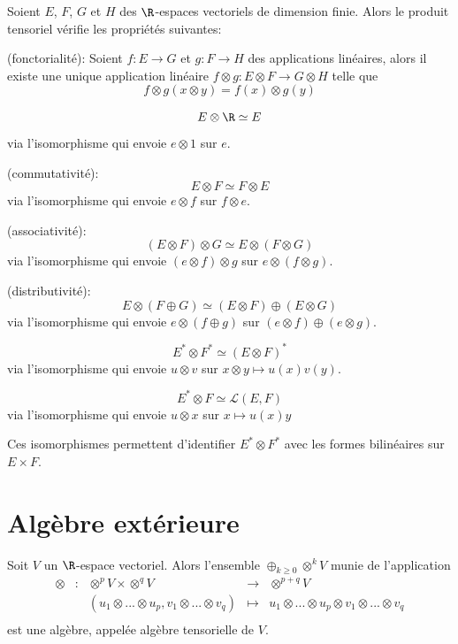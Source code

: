 \begin{pro}
Soient $E$, $F$, $G$ et $H$ des $\R$-espaces vectoriels de dimension finie. Alors le produit tensoriel vérifie les propriétés suivantes:
\be
	\item (fonctorialité): Soient $f: E\to G$ et $g: F\to H$ des applications linéaires, alors il existe une unique application linéaire $f\otimes g: E\otimes F \to G \otimes H$ telle que 
	$$f\otimes g(x\otimes y) = f(x) \otimes g(y)$$
	\item $$E \otimes \R \simeq E$$
	via l'isomorphisme qui envoie $e\otimes 1$ sur $e$.
	\item (commutativité): $$E\otimes F \simeq F \otimes E$$
	via l'isomorphisme qui envoie $e\otimes f$ sur $f\otimes e$.
	\item (associativité): $$(E\otimes F)\otimes G \simeq E \otimes (F\otimes G)$$
	via l'isomorphisme qui envoie $(e\otimes f)\otimes g$ sur $e\otimes (f\otimes g)$.
	\item (distributivité): $$E \otimes (F \oplus G) \simeq (E \otimes F) \oplus (E \otimes G)$$
	via l'isomorphisme qui envoie $e\otimes (f\oplus g)$ sur $(e\otimes f) \oplus (e \otimes g)$.
	\item $$E^* \otimes F^* \simeq (E\otimes F)^*$$
	via l'isomorphisme qui envoie $u\otimes v$ sur $x\otimes y \mapsto u(x)v(y)$.
	\item $$E^*\otimes F \simeq \mathscr{L}(E, F)$$
	via l'isomorphisme qui envoie $u\otimes x$ sur $x \mapsto u(x)y$
\ee
\end{pro}

\begin{rem}
Ces isomorphismes permettent d'identifier $E^*\otimes F^*$ avec les formes bilinéaires sur $E \times F$.
\end{rem}

\section{Algèbre extérieure}

\begin{defi}
Soit $V$ un $\R$-espace vectoriel. Alors l'ensemble $\oplus_{k\geq 0} \otimes^k V$ munie de l'application 
$$\begin{array}{ccccc}
	\otimes & : & \otimes^p V\times \otimes^q V & \to & \otimes^{p+q} V \\
		& & (u_1\otimes ...\otimes u_p, v_1 \otimes ... \otimes v_q) & \mapsto & u_1 \otimes ... \otimes u_p \otimes v_1 \otimes ... \otimes v_q \\
\end{array}$$
est une algèbre, appelée algèbre tensorielle de $V$.
\end{defi}

